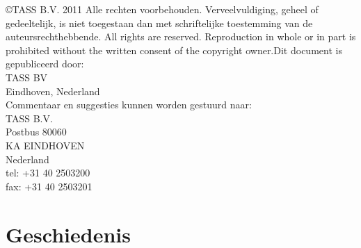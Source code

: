 \documentclass[]{article}
\begin{document}
\newpage

\noindent\copyright  TASS B.V. 2011
Alle rechten voorbehouden. Verveelvuldiging, geheel of gedeeltelijk, is
niet toegestaan dan met schriftelijke toestemming van de
auteursrechthebbende.
All rights are reserved. Reproduction in whole or in part is prohibited
without the written consent of the copyright owner.Dit document is
gepubliceerd door:\\
TASS BV\\
Eindhoven, Nederland\\

\noindent Commentaar en suggesties kunnen worden gestuurd naar:\\
\indent TASS B.V.\\
\indent\indent Postbus 80060\\
\indent{} KA  EINDHOVEN\\
\indent\indent Nederland\\
\indent\indent tel:  +31 40 2503200\\
\indent\indent fax:  +31 40 2503201\\

\vspace*{\fill}

\section*{Geschiedenis}
\end{document}
